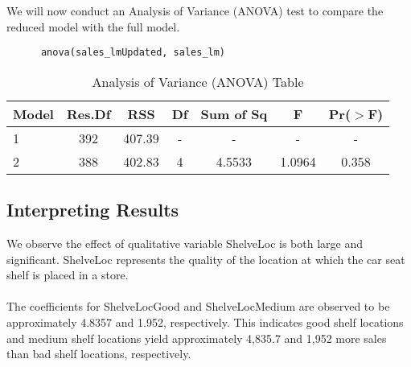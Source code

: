 \documentclass{article}
\theoremstyle{mytheoremstyle}
\theoremstyle{mytheoremstyle}
\theoremstyle{myproblemstyle}
\begin{document}
      We will now conduct an Analysis of Variance (ANOVA) test to compare the reduced model with the full model.
      \begin{lstlisting}
      anova(sales_lmUpdated, sales_lm)
      \end{lstlisting}
      \begin{table}[H]
      \centering
      \begin{tabular}{lcccccc}
          \toprule
          Model & Res.Df & RSS   & Df  & Sum of Sq & F      & Pr($>$F) \\
          \midrule
          1     & 392    & 407.39 & -   & -         & -      & -       \\
          2     & 388    & 402.83 & 4   & 4.5533    & 1.0964 & 0.358   \\
          \bottomrule
      \end{tabular}
      \caption{Analysis of Variance (ANOVA) Table}
      \label{tab:anova}
      \end{table}
      \vspace{0.25in}
      \subsection{Interpreting Results}
      We observe the effect of qualitative variable ShelveLoc is both large and significant. 
      ShelveLoc represents the quality of the location at which the car seat shelf is placed in a store.\\ 
      \\ 
      The coefficients for ShelveLocGood and ShelveLocMedium are observed to be approximately 4.8357 and 1.952, respectively. 
      This indicates good shelf locations and medium shelf locations yield approximately 4,835.7 and 1,952 more sales than bad shelf locations, respectively.
      \vspace{0.25in}
\end{document}
